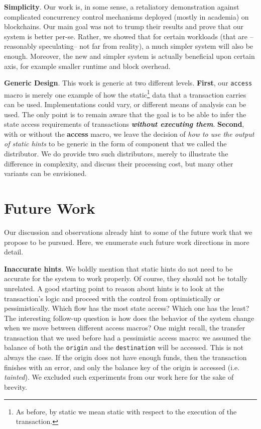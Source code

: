 \textbf{Simplicity}. Our work is, in some sense, a retaliatory demonstration against complicated
concurrency control mechanisms deployed (mostly in academia) on blockchains. Our main goal was not to
trump their results and prove that our system is better per-se. Rather, we showed that for certain
workloads (that are --reasonably speculating-- not far from reality), a much simpler system will
also be enough. Moreover, the new and simpler system is actually beneficial upon certain axis, for
example smaller runtime and block overhead.

\textbf{Generic Design}. This work is generic at two different levels. \textbf{First}, our
\texttt{access} macro is merely one example of how the static\footnote{As before, by static we mean
static with respect to the execution of the transaction.} data that a transaction carries can be
used. Implementations could vary, or different means of analysis can be used. The only point is to
remain aware that the goal is to be able to infer the state access requirements of transactions
\textit{\textbf{without executing them}}. \textbf{Second}, with or without the \textbf{access}
macro, we leave the decision of \textit{how to use the output of static hints} to be generic in the
form of component that we called the distributor. We do provide two such distributors, merely to illustrate 
the difference in complexity, and discuss their processing cost, but many other variants can be envisioned. 

\section{Future Work}

Our discussion and observations already hint to some of the future work that we propose to be pursued. Here, we
enumerate such future work directions in more detail.

\textbf{Inaccurate hints}. We boldly mention that static hints do not need to be accurate for the
system to work properly. Of course, they should not be totally unrelated. A good starting point to
reason about hints is to look at the transaction's logic and proceed with the control from
optimistically or pessimistically. Which flow has the most state access? Which one has the least?
The interesting follow-up question is how does the behavior of the system change when we move between
different access macros? One might recall, the transfer transaction that we used before had a
pessimistic access macro: we assumed the balance of both the \texttt{origin} and the
\texttt{destination} will be accessed. This is not always the case. If the origin does not have
enough funds, then the transaction finishes with an error, and only the balance key of the origin is
accessed (i.e. \textit{tainted}). We excluded such experiments from our work here for the sake of
brevity.

